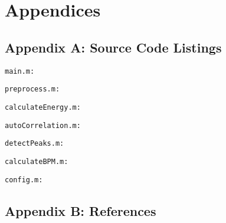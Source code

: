 \section{Appendices}

\subsection{Appendix A: Source Code Listings}

\texttt{main.m:}

\newpage

\texttt{preprocess.m:}

\newpage

\texttt{calculateEnergy.m:}

\newpage

\texttt{autoCorrelation.m:}

\newpage

\texttt{detectPeaks.m:}

\newpage

\texttt{calculateBPM.m:}

\newpage

\texttt{config.m:}


\subsection{Appendix B: References}
